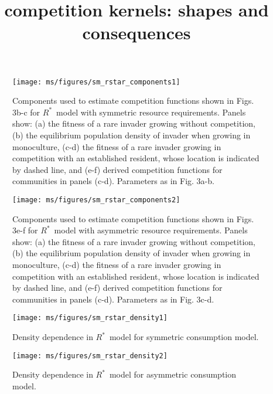 \documentclass[10pt,twoside]{article}
\title{competition kernels: shapes and consequences}
\date{}
\newcommand{\Rstar}{\ensuremath{R^*}}
\newcommand{\todo}[1]{{\color{navy}{(todo: #1)}}}
\begin{document}
\maketitle

\setcounter{secnumdepth}{1}

\newpage

\begin{figure}[ht]
 \centering
 \texttt{[image: ms/figures/sm\_rstar\_components1]}
 \caption{ Components used to estimate competition functions shown in Figs. 3b-c for \Rstar\ model with symmetric resource requirements. Panels show: (a) the fitness of a rare invader growing without competition, (b) the equilibrium population density of invader when growing in monoculture, (c-d) the fitness of a rare invader growing in competition with an established resident, whose location is indicated by dashed line, and (e-f) derived competition functions for communities in panels (c-d). Parameters as in Fig. 3a-b.}
  \label{fig:sm_rstar_components1}
\end{figure}

\newpage

\begin{figure}[ht]
 \centering
 \texttt{[image: ms/figures/sm\_rstar\_components2]}
 \caption{Components used to estimate competition functions shown in Figs. 3e-f for \Rstar\ model with asymmetric resource requirements. Panels show: (a) the fitness of a rare invader growing without competition, (b) the equilibrium population density of invader when growing in monoculture, (c-d) the fitness of a rare invader growing in competition with an established resident, whose location is indicated by dashed line, and (e-f) derived competition functions for communities in panels (c-d). Parameters as in Fig. 3c-d.} 
  \label{fig:sm_rstar_components2} 
  \end{figure}

\newpage

\begin{figure}[ht]
  \centering
  \texttt{[image: ms/figures/sm\_rstar\_density1]}
  \caption{Density dependence in \Rstar\ model for symmetric consumption model. 
  \todo{MORE details needed here. See explanation for lma.}
  }
  \label{fig:rstar_density_dependence1}
\end{figure}

\newpage

\begin{figure}[ht]
  \centering
  \texttt{[image: ms/figures/sm\_rstar\_density2]}
  \caption{Density dependence in \Rstar\ model for asymmetric consumption model. 
  \todo{MORE details needed here. See explanation for lma.}
  }
  \label{fig:rstar_density_dependence2}
\end{figure}
\end{document}
